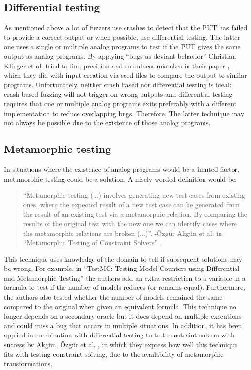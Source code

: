 \subsection{Differential testing}
\label{fuzzing:DifferentialTesting}
As mentioned above a lot of fuzzers use crashes to detect that the PUT has failed to provide a correct output or when possible, use differential testing. The latter one uses a single or multiple analog programs to test if the PUT gives the same output as analog programs. By applying “bugs-as-deviant-behavior” Christian Klinger et al. tried to find precision and soundness mistakes in their paper \cite{48klinger2019differentially}, which they did with input creation via seed files to compare the output to similar programs. Unfortunately, neither crash based nor differential testing is ideal: crash based fuzzing will not trigger on wrong outputs and differential testing requires that one or multiple analog programs exits preferably with a different implementation to reduce overlapping bugs. Therefore, The latter technique may not always be possible due to the existence of those analog programs.

\subsection{Metamorphic testing}
\label{fuzzing:MetamorphicTesting}
In situations where the existence of analog programs would be a limited factor, metamorphic testing could be a solution. A nicely worded definition would be: 

\begin{quote}
	\label{quote:MetaMorphic}
	“Metamorphic testing (...) involves generating new test cases from existing ones, where the expected result of a new test case can be generated from the result of an existing test via a metamorphic relation. By comparing the results of the
	original test with the new one we can identify cases where the metamorphic relations are broken (...)”.
	\newline
	-\"{O}zg\"{u}r Akg\"{u}n et al. in “Metamorphic Testing of Constraint Solvers” \cite{50akgun2018metamorphic}.
\end{quote}

\noindent This technique uses knowledge of the domain to tell if subsequent solutions may be wrong. For example, in “TestMC: Testing Model Counters using Differential and Metamorphic Testing” \cite{49usman2020testmc} the authors add an extra restriction to a variable in a formula to test if the number of models reduces (or remains equal). 
Furthermore, the authors also tested whether the number of models remained the same compared to the original when given an equivalent formula.
This technique no longer depends on a secondary oracle but it does depend on multiple executions and could miss a bug that occurs in multiple situations. In addition, it has been applied in combination with differential testing to test constraint solvers with success by Akg{\"u}n, {\"O}zg{\"u}r et al. \cite{50akgun2018metamorphic}, in which they express how well this technique fits with testing constraint solving, due to the availability of metamorphic transformations.

